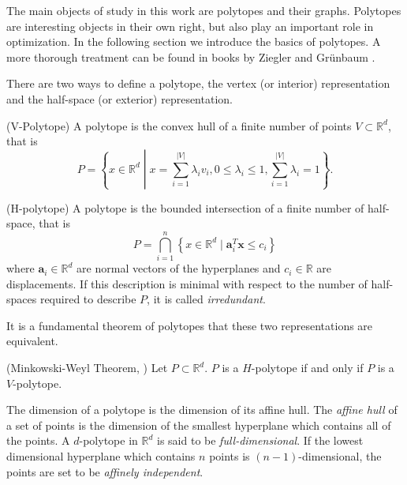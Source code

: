The main objects of study in this work are polytopes and their graphs. Polytopes are 
interesting 
objects in their own right, but also play an important role in
optimization. In the following section we introduce the basics of polytopes. 
A more thorough treatment can be found in books by Ziegler \cite{PolyLec} 
and Gr\"unbaum \cite{Grunbaum69convexpolytopes}. 

There are 
two ways to define a polytope, the vertex (or interior) representation and the 
half-space (or exterior) representation.

\begin{definition}
(V-Polytope) A polytope is the convex hull of a finite number of points $V 
\subset \mathbb{R}^d$, that is 
\begin{equation}
 P = \left\{x\in \mathbb{R}^d \middle| x = \sum_{i=1}^{|V|} \lambda_i v_i, 
0\leq \lambda_i \leq 1, \sum_{i=1}^{|V|} \lambda_i = 1 \right\}.
\end{equation}

\end{definition}

\begin{definition}
 (H-polytope) A polytope is the bounded intersection of a finite number of 
half-space, that is
\begin{equation}
 P = \bigcap_{i=1}^n \left\{x \in \mathbb{R}^d \mid \mathbf{a}_i^T \mathbf{x} 
\leq 
c_i \right\}
\end{equation}
where $\mathbf{a}_i \in \mathbb{R}^d$ are normal vectors of the hyperplanes and 
$c_i \in 
\mathbb{R}$ are displacements. If this description is minimal with respect to 
the number of half-spaces required to describe $P$, it is called 
\textit{irredundant}.
\end{definition}

It is a fundamental theorem of polytopes that these two representations are 
equivalent.
\begin{theorem}
(Minkowski-Weyl Theorem, \cite[Thm. 1.1.]{PolyLec}) Let $P \subset \mathbb{R}^d$. 
$P$ is a $H$-polytope if and only if $P$ is a $V$-polytope.
\end{theorem}
The dimension of a polytope is the dimension of its affine hull. The \textit{affine 
hull} of a set of points is the dimension of the smallest hyperplane which 
contains all of the points. A $d$-polytope in $\mathbb{R}^d$ is said to be 
\textit{full-dimensional}. If the lowest dimensional hyperplane which contains 
$n$ points is $(n-1)$-dimensional, the points are set to be \textit{affinely 
independent}.

